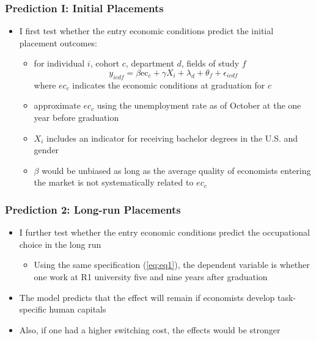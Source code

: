 \documentclass[11pt]{beamer}
\begin{document}
\begin{frame}
	\frametitle{Prediction I: Initial Placements}
	\begin{itemize}
		\item I first test whether the entry economic conditions predict the initial placement outcomes: 
		\begin{itemize}
			\item for individual $i$, cohort $c$, department $d$, fields of study $f$
		\begin{equation}
			\label{eq:eq1}
			y_{icdf} = \beta \text{ec}_{c}+\gamma X_{i}+\lambda_{d}+\theta_f  +\epsilon_{icdf}
		\end{equation}
	where $ec_c$ indicates the economic conditions at graduation for $c$
	\item  approximate $ec_c$  using the unemployment rate as of October at the one year before graduation
	\item $X_i$ includes an indicator for receiving bachelor degrees in the U.S. and gender
	\item  $\beta$ would be unbiased as long as the average quality of economists entering the market is not systematically related to $ec_c$
\end{itemize}
	\end{itemize}
\end{frame}





\begin{frame}
	\frametitle{Prediction 2: Long-run Placements}
	\begin{itemize}
		\item I further test whether the entry economic conditions predict the occupational choice in the long run
		\begin{itemize}
			\item Using the same specification (\ref{eq:eq1}), the dependent variable is whether one work at R1 university five and nine years after graduation
		\end{itemize}
		\vspace{2 mm}
		\item The model predicts that the effect will remain if economists develop task-specific human capitals 
		\vspace{2 mm}
		\item Also, if one had a higher switching cost, the effects would be stronger
	\end{itemize}
\end{frame}
\end{document}
